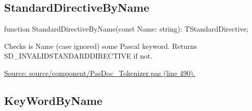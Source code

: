 \documentclass{report}
\newif\ifpdf
\begin{document}
\subsection*{StandardDirectiveByName}
\fi
\label{PasDoc_Tokenizer-StandardDirectiveByName}
\begin{list}{}{
\setlength{\itemindent}{0cm}
\setlength{\listparindent}{0cm}
\setlength{\leftmargin}{\evensidemargin}
\addtolength{\leftmargin}{\tmplength}
\settowidth{\labelsep}{X}
\addtolength{\leftmargin}{\labelsep}
\setlength{\labelwidth}{\tmplength}
}
\item[\textbf{Declaration}\hfill]
\ifpdf
\begin{flushleft}
\fi
\begin{ttfamily}
function StandardDirectiveByName(const Name: string): TStandardDirective;\end{ttfamily}

\ifpdf
\end{flushleft}
\fi

\par
\item[\textbf{Description}]
Checks is Name (case ignored) some Pascal keyword. Returns SD{\_}INVALIDSTANDARDDIRECTIVE if not.\par
\href{https://github.com/pasdoc/pasdoc/blob/master/source/component/PasDoc_Tokenizer.pas#L490}{Source: source/component/PasDoc{\_}Tokenizer.pas (line 490).}

\end{list}
\ifpdf
\subsection*{\large{\textbf{KeyWordByName}}\normalsize\hspace{1ex}\hrulefill}
\else
\end{document}
